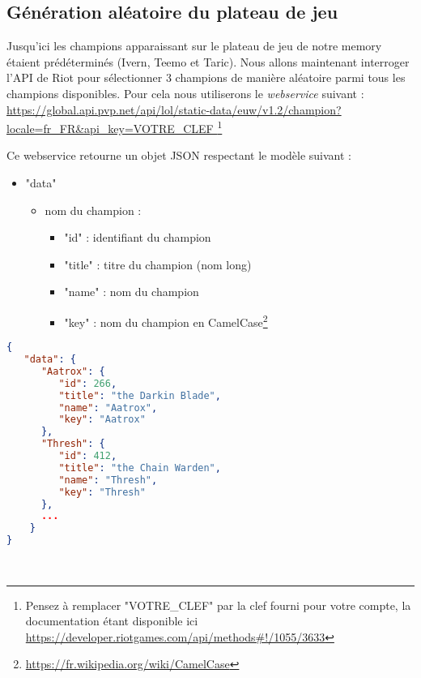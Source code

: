 \documentclass[a4paper,11pt]{article}
\theoremstyle{mytheor}
\begin{document}
\subsection{Génération aléatoire du plateau de jeu}
Jusqu'ici les champions apparaissant sur le plateau de jeu de notre memory étaient prédéterminés (Ivern, Teemo et Taric). Nous allons maintenant interroger l'API de Riot pour sélectionner 3 champions de manière aléatoire parmi tous les champions disponibles. Pour cela nous utiliserons le \textit{webservice} suivant : \\
\url{https://global.api.pvp.net/api/lol/static-data/euw/v1.2/champion?locale=fr_FR&api_key=VOTRE_CLEF }\footnote{Pensez à remplacer "VOTRE\_CLEF" par la clef fourni pour votre compte, la documentation étant disponible ici   \url{https://developer.riotgames.com/api/methods\#!/1055/3633}}\\
\begin{minipage}[h]{.45\textwidth}

Ce webservice retourne un objet JSON respectant le modèle suivant :
\begin{itemize}
    \item "data"
    \begin{itemize}
        \item nom du champion : 
        \begin{itemize}
            \item "id" : identifiant du champion
            \item "title" : titre du champion (nom long)
            \item "name" : nom du champion
            \item "key" : nom du champion en CamelCase\footnote{\url{https://fr.wikipedia.org/wiki/CamelCase}}\\ 
        \end{itemize}
    \end{itemize}
\end{itemize}
\end{minipage}
\hfill
\noindent
\begin{minipage}[h]{.45\textwidth}
\begin{lstlisting}[language=json,caption="Exemple de JSON"]
{
   "data": {
      "Aatrox": {
         "id": 266,
         "title": "the Darkin Blade",
         "name": "Aatrox",
         "key": "Aatrox"
      },
      "Thresh": {
         "id": 412,
         "title": "the Chain Warden",
         "name": "Thresh",
         "key": "Thresh"
      },
      ...
    }
}
\end{lstlisting}
\end{minipage}
\\
\end{document}
